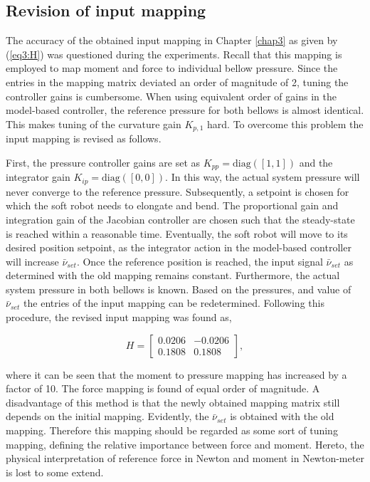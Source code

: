 \subsection*{Revision of input mapping}

The accuracy of the obtained input mapping in Chapter \ref{chap3} as given by (\ref{eq3:H}) was questioned during the experiments. Recall that this mapping is employed to map moment and force to individual bellow pressure. Since the entries in the mapping matrix deviated an order of magnitude of 2, tuning the controller gains is cumbersome. When using equivalent order of gains in the model-based controller, the reference pressure for both bellows is almost identical. This makes tuning of the curvature gain $K_{p,1}$ hard. To overcome this problem the input mapping is revised as follows. 

First, the pressure controller gains are set as $K_{pp} =\text{diag}([1,1])$ and the integrator gain $K_{ip} = \text{diag}([0,0])$. In this way, the actual system pressure will never converge to the reference pressure. Subsequently, a setpoint is chosen for which the soft robot needs to elongate and bend. The proportional gain and integration gain of the Jacobian controller are chosen such that the steady-state is reached within a reasonable time. Eventually, the soft robot will move to its desired position setpoint, as the integrator action in the model-based controller will increase $\bar{\nu}_{set}$. Once the reference position is reached, the input signal $\bar{\nu}_{set}$ as determined with the old mapping remains constant. Furthermore, the actual system pressure in both bellows is known. Based on the pressures, and value of $\bar{\nu}_{set}$ the entries of the input mapping can be redetermined. Following this procedure, the revised input mapping was found as,

\begin{equation}
    H = \begin{bmatrix} 	0.0206 &  -0.0206 \\ 
	0.1808 & 0.1808 \end{bmatrix},
    \label{eq4:revisedH}
\end{equation}

where it can be seen that the moment to pressure mapping has increased by a factor of 10. The force mapping is found of equal order of magnitude. A disadvantage of this method is that the newly obtained mapping matrix still depends on the initial mapping. Evidently, the $\bar{\nu}_{set}$ is obtained with the old mapping. Therefore this mapping should be regarded as some sort of tuning mapping, defining the relative importance between force and moment. Hereto, the physical interpretation of reference force in Newton and moment in Newton-meter is lost to some extend. 

